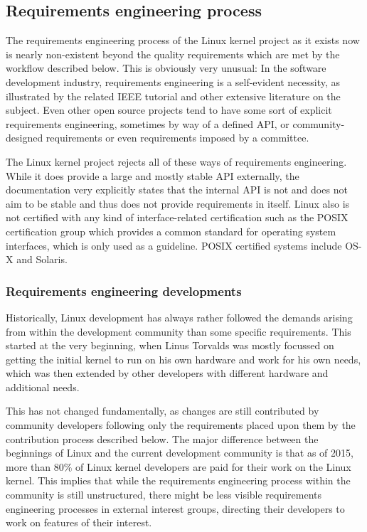 \documentclass{sig-alternate-05-2015}
\begin{document}
\subsection{Requirements engineering process}

The requirements engineering process of the Linux kernel project as it exists now is nearly non-existent beyond the quality requirements which are met by the workflow described below.
This is obviously very unusual: In the software development industry, requirements engineering is a self-evident necessity, as illustrated by the related IEEE tutorial\cite{thayer1997software} and other extensive literature on the subject.
Even other open source projects tend to have some sort of explicit requirements engineering, sometimes by way of a defined API, or community-designed requirements or even requirements imposed by a committee.

The Linux kernel project rejects all of these ways of requirements engineering.
While it does provide a large and mostly stable API externally, the documentation very explicitly states that the internal API is not and does not aim to be stable and thus does not provide requirements in itself.
Linux also is not certified with any kind of interface-related certification such as the POSIX certification group which provides a common standard for operating system interfaces, which is only used as a guideline. POSIX certified systems include OS-X and Solaris.

\subsubsection{Requirements engineering developments}

Historically, Linux development has always rather followed the demands arising from within the development community than some specific requirements.
This started at the very beginning, when Linus Torvalds was mostly focussed on getting the initial kernel to run on his own hardware and work for his own needs, which was then extended by other developers with different hardware and additional needs.

This has not changed fundamentally, as changes are still contributed by community developers following only the requirements placed upon them by the contribution process described below.
The major difference between the beginnings of Linux and the current development community is that as of 2015, more than \(80\%\) of Linux kernel developers are paid for their work on the Linux kernel\cite{corbet2015linux}.
This implies that while the requirements engineering process within the community is still unstructured, there might be less visible requirements engineering processes in external interest groups, directing their developers to work on features of their interest.
\end{document}
